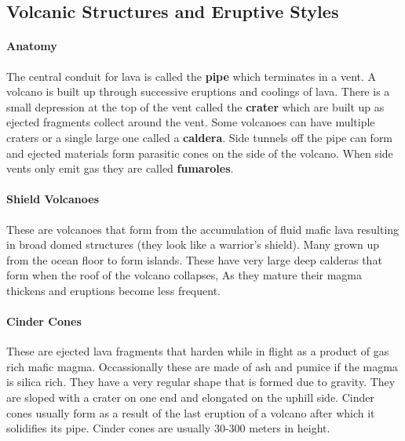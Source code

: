 \documentclass{article}
\begin{document}

\subsection{Volcanic Structures and Eruptive Styles} %
\label{sub:volcanic_structures_and_eruptive_styles}

\paragraph{Anatomy} %
\label{par:anatomy}
The central conduit for lava is called the \textbf{pipe} which terminates in a vent. A volcano is built up through successive eruptions and coolings of lava. There is a small depression at the top of the vent called the \textbf{crater} which are built up as ejected fragments collect around the vent. Some volcanoes can have multiple craters or a single large one called a \textbf{caldera}. Side tunnels off the pipe can form and ejected materials form parasitic cones on the side of the volcano. When side vents only emit gas they are called \textbf{fumaroles}.

\paragraph{Shield Volcanoes} %
\label{par:shield_volcanoes}
These are volcanoes that form from the accumulation of fluid mafic lava resulting in broad domed structures (they look like a warrior's shield). Many grown up from the ocean floor to form islands. These have very large deep calderas that form when the roof of the volcano collapses, As they mature their magma thickens and eruptions become less frequent.

\paragraph{Cinder Cones} %
\label{par:cinder_cones}
These are ejected lava fragments that harden while in flight as a product of gas rich mafic magma. Occassionally these are made of ash and pumice if the magma is silica rich. They have a very regular shape that is formed due to gravity. They are sloped with a crater on one end and elongated on the uphill side. Cinder cones usually form as a result of the last eruption of a volcano after which it solidifies its pipe. Cinder cones are usually 30-300 meters in height.
\end{document}
